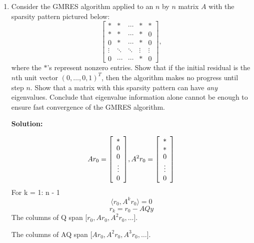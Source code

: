 \documentclass[letterpaper,12pt]{article}
\newenvironment{mat}{\left[ \begin{array}{ccccccccccccc}}{\end{array}\right]}
\newcommand\bcm{\begin{mat}}
\newcommand\ecm{\end{mat}}
\begin{document}
\begin{enumerate}
\begin{enumerate}
{\bf Solution:}


If we know $\| I - M^{-1} A \|_2 = \frac{1}{2}$,
\[
||e_k||_2 \leq \| I - M^{-1} A \|_2^k ||e_0||_2 \leq 2^{-k} .\]
To get the error below $2^{-20}$, we need 20 iterations.

If $I - M^{-1} A$ is normal, then $\rho ( I - M^{-1} A ) =\| I - M^{-1} A \|_2 $. So, we would only need 20.

If $I - M^{-1} A$ is diagonalizable with condition number $\kappa$

\[
||e_k||_2 \leq \| I - M^{-1} A \|_2^k ||e_0||_2 \leq \kappa^{k}   \]
\[\kappa^{k} =  2^{-20}  \]
\[k \log(\kappa) =  -20 \log(2)  \]
\[k = \frac{-20 \log(2) }{\log(\kappa)}   \]

Without the condition number, we cannot determine the bounds.

\item
Consider the GMRES algorithm applied to an $n$ by $n$ matrix $A$ with the sparsity pattern 
pictured below:
\[
\left[ \begin{array}{ccccc}
\ast & \ast & \cdots & \ast & \ast \\
\ast & \ast & \cdots & \ast & 0 \\
0    & \ast & \cdots & \ast & 0 \\
\vdots  & \ddots & \ddots & \vdots & \vdots \\
0    & \cdots    & \cdots & \ast & 0 \end{array} \right] ,
\]
where the $\ast$'s represent nonzero entries.  Show that if the initial residual is the 
$n$th unit vector $( 0, \ldots , 0 , 1 )^T$, then the algorithm makes no progress
until step $n$.  Show that a matrix with this sparsity pattern can have {\em any}
eigenvalues.  Conclude that eigenvalue information alone cannot be enough to ensure
fast convergence of the GMRES algorithm.


{\bf Solution:}

\[Ar_0 =  \bcm *\\  0\\ 0\\ \vdots \\ 0 \ecm, A^2r_0 =  \bcm *\\  *\\ 0\\\vdots \\ 0 \ecm\]
For k = 1: n - 1
\[\langle r_0, A^k r_0 \rangle = 0\]
\[r_k = r_0 - AQy\]
The columns of Q span [$r_0, Ar_0, A^2r_0, \ldots $].

The columns of AQ span [$Ar_0, A^2r_0, A^3r_0, \ldots $].


\end{enumerate}
\end{enumerate}
\end{document}
